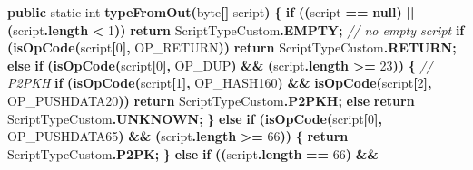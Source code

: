 \documentclass[
  italian,
  openany]{book}
\newenvironment{Shaded}{\begin{snugshade}}{\end{snugshade}}
\newcommand{\CommentTok}[1]{\textcolor[rgb]{0.56,0.35,0.01}{\textit{#1}}}
\newcommand{\ControlFlowTok}[1]{\textcolor[rgb]{0.13,0.29,0.53}{\textbf{#1}}}
\newcommand{\DataTypeTok}[1]{\textcolor[rgb]{0.13,0.29,0.53}{#1}}
\newcommand{\DecValTok}[1]{\textcolor[rgb]{0.00,0.00,0.81}{#1}}
\newcommand{\FunctionTok}[1]{\textcolor[rgb]{0.13,0.29,0.53}{\textbf{#1}}}
\newcommand{\KeywordTok}[1]{\textcolor[rgb]{0.13,0.29,0.53}{\textbf{#1}}}
\newcommand{\NormalTok}[1]{#1}
\newcommand{\OperatorTok}[1]{\textcolor[rgb]{0.81,0.36,0.00}{\textbf{#1}}}
\begin{document}
\begin{Shaded}
\begin{Highlighting}[]
    \KeywordTok{public} \DataTypeTok{static} \DataTypeTok{int} \FunctionTok{typeFromOut}\OperatorTok{(}\DataTypeTok{byte}\OperatorTok{[]}\NormalTok{ script}\OperatorTok{)} \OperatorTok{\{}
        \ControlFlowTok{if} \OperatorTok{((}\NormalTok{script }\OperatorTok{==} \KeywordTok{null}\OperatorTok{)} \OperatorTok{||} \OperatorTok{(}\NormalTok{script}\OperatorTok{.}\FunctionTok{length} \OperatorTok{\textless{}} \DecValTok{1}\OperatorTok{))}
            \ControlFlowTok{return}\NormalTok{ ScriptTypeCustom}\OperatorTok{.}\FunctionTok{EMPTY}\OperatorTok{;}
        \CommentTok{// no empty script}
        \ControlFlowTok{if} \OperatorTok{(}\FunctionTok{isOpCode}\OperatorTok{(}\NormalTok{script}\OperatorTok{[}\DecValTok{0}\OperatorTok{],}\NormalTok{ OP\_RETURN}\OperatorTok{))}
            \ControlFlowTok{return}\NormalTok{ ScriptTypeCustom}\OperatorTok{.}\FunctionTok{RETURN}\OperatorTok{;}
        \ControlFlowTok{else} \ControlFlowTok{if} \OperatorTok{(}\FunctionTok{isOpCode}\OperatorTok{(}\NormalTok{script}\OperatorTok{[}\DecValTok{0}\OperatorTok{],}\NormalTok{ OP\_DUP}\OperatorTok{)} \OperatorTok{\&\&} \OperatorTok{(}\NormalTok{script}\OperatorTok{.}\FunctionTok{length} \OperatorTok{\textgreater{}=} \DecValTok{23}\OperatorTok{))} \OperatorTok{\{}
            \CommentTok{// P2PKH}
            \ControlFlowTok{if} \OperatorTok{(}\FunctionTok{isOpCode}\OperatorTok{(}\NormalTok{script}\OperatorTok{[}\DecValTok{1}\OperatorTok{],}\NormalTok{ OP\_HASH160}\OperatorTok{)} \OperatorTok{\&\&} \FunctionTok{isOpCode}\OperatorTok{(}\NormalTok{script}\OperatorTok{[}\DecValTok{2}\OperatorTok{],}\NormalTok{ OP\_PUSHDATA20}\OperatorTok{))}
                \ControlFlowTok{return}\NormalTok{ ScriptTypeCustom}\OperatorTok{.}\FunctionTok{P2PKH}\OperatorTok{;}
            \ControlFlowTok{else} \ControlFlowTok{return}\NormalTok{ ScriptTypeCustom}\OperatorTok{.}\FunctionTok{UNKNOWN}\OperatorTok{;}
        \OperatorTok{\}} \ControlFlowTok{else} \ControlFlowTok{if} \OperatorTok{(}\FunctionTok{isOpCode}\OperatorTok{(}\NormalTok{script}\OperatorTok{[}\DecValTok{0}\OperatorTok{],}\NormalTok{ OP\_PUSHDATA65}\OperatorTok{)} \OperatorTok{\&\&} \OperatorTok{(}\NormalTok{script}\OperatorTok{.}\FunctionTok{length} \OperatorTok{\textgreater{}=} \DecValTok{66}\OperatorTok{))} \OperatorTok{\{}
            \ControlFlowTok{return}\NormalTok{ ScriptTypeCustom}\OperatorTok{.}\FunctionTok{P2PK}\OperatorTok{;}
        \OperatorTok{\}} \ControlFlowTok{else} \ControlFlowTok{if} \OperatorTok{((}\NormalTok{script}\OperatorTok{.}\FunctionTok{length} \OperatorTok{==} \DecValTok{66}\OperatorTok{)} \OperatorTok{\&\&}

\end{Highlighting}
\end{Shaded}
\end{document}
